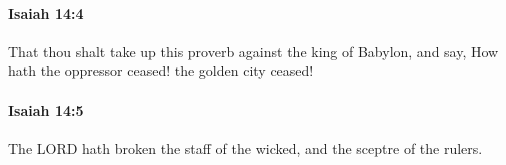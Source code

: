 		\paragraph{Isaiah 14:4} %
			\label{ISAIAH-14-4}

			That thou shalt take up this proverb against the king of Babylon, and say, How hath the oppressor ceased! the golden city ceased!


		\paragraph{Isaiah 14:5} %
			\label{ISAIAH-14-5}

			The LORD hath broken the staff of the wicked, and the sceptre of the rulers.


